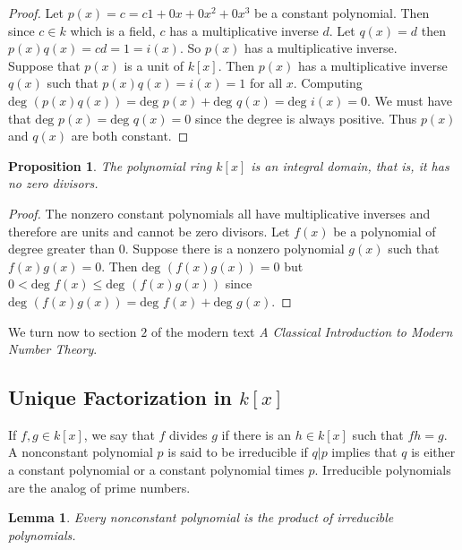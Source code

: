 \documentclass{article}
\theoremstyle{problemstyle}
\newtheorem{proposition}{Proposition}
\newtheorem{lemma}{Lemma}
\begin{document}
\begin{proof}
Let $p(x) = c = c1 + 0x +0x^2 + 0x^3$ be a constant polynomial. Then since $c \in k$ which is a field, $c$ has a multiplicative inverse $d$. Let $q(x) = d$ then $p(x)q(x) = cd = 1 = i(x)$. So $p(x)$ has a multiplicative inverse.\\

Suppose that $p(x)$ is a unit of $k[x]$. Then $p(x)$ has a multiplicative inverse $q(x)$ such that $p(x)q(x) = i(x) = 1$ for all $x$. Computing $\text{deg }(p(x)q(x)) = \text{deg }p(x) + \text{deg }q(x) = \text{deg }i(x) = 0$. We must have that $\text{deg }p(x) = \text{deg }q(x) = 0$ since the degree is always positive. Thus $p(x)$ and $q(x)$ are both constant. 
\end{proof}

\begin{proposition}
The polynomial ring $k[x]$ is an integral domain, that is, it has no zero divisors. 
\end{proposition}

\begin{proof}
The nonzero constant polynomials all have multiplicative inverses and therefore are units and cannot be zero divisors. Let $f(x)$ be a polynomial of degree greater than $0$. Suppose there is a nonzero polynomial $g(x)$ such that $f(x)g(x) = 0$. Then $\text{deg }(f(x)g(x)) = 0$ but $0< \text{deg }f(x) \leq \text{deg }(f(x)g(x))$ since $\text{deg }(f(x)g(x)) = \text{deg }f(x) + \text{deg }g(x)$. 
\end{proof}

We turn now to section $2$ of the modern text \textit{A Classical Introduction to Modern Number Theory}. 

\subsection*{Unique Factorization in $k[x]$}
\setcounter{proposition}{0}
\setcounter{definition}{0}

If $f,g \in k[x]$, we say that $f$ divides $g$ if there is an $h \in k[x]$ such that $fh = g$. A nonconstant polynomial $p$ is said to be irreducible if $q|p$ implies that $q$ is either a constant polynomial or a constant polynomial times $p$. Irreducible polynomials are the analog of prime numbers. 

\begin{lemma}
Every nonconstant polynomial is the product of irreducible polynomials. 
\end{lemma}
\end{document}
